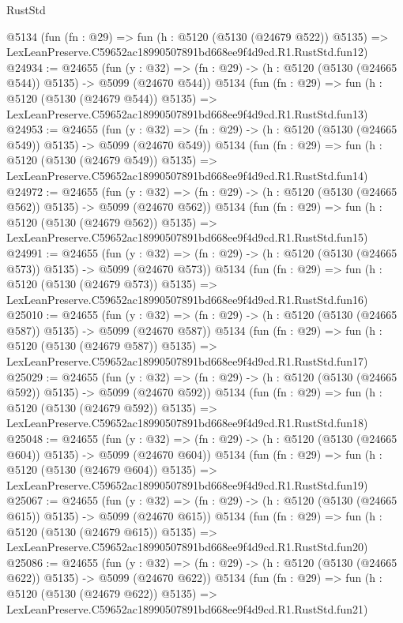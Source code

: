 \begin{lexlean}{RustStd}
\begin{coremodule}
    @5134
    (fun (fn : @29) =>
    fun (h : @5120 (@5130 (@24679 @522)) @5135) =>
    LexLeanPreserve.C59652ac18990507891bd668ee9f4d9cd.R1.RustStd.fun12)
@24934 := @24655
    (fun (y : @32) => (fn : @29) -> (h : @5120 (@5130 (@24665 @544)) @5135) -> @5099 (@24670 @544))
    @5134
    (fun (fn : @29) =>
    fun (h : @5120 (@5130 (@24679 @544)) @5135) =>
    LexLeanPreserve.C59652ac18990507891bd668ee9f4d9cd.R1.RustStd.fun13)
@24953 := @24655
    (fun (y : @32) => (fn : @29) -> (h : @5120 (@5130 (@24665 @549)) @5135) -> @5099 (@24670 @549))
    @5134
    (fun (fn : @29) =>
    fun (h : @5120 (@5130 (@24679 @549)) @5135) =>
    LexLeanPreserve.C59652ac18990507891bd668ee9f4d9cd.R1.RustStd.fun14)
@24972 := @24655
    (fun (y : @32) => (fn : @29) -> (h : @5120 (@5130 (@24665 @562)) @5135) -> @5099 (@24670 @562))
    @5134
    (fun (fn : @29) =>
    fun (h : @5120 (@5130 (@24679 @562)) @5135) =>
    LexLeanPreserve.C59652ac18990507891bd668ee9f4d9cd.R1.RustStd.fun15)
@24991 := @24655
    (fun (y : @32) => (fn : @29) -> (h : @5120 (@5130 (@24665 @573)) @5135) -> @5099 (@24670 @573))
    @5134
    (fun (fn : @29) =>
    fun (h : @5120 (@5130 (@24679 @573)) @5135) =>
    LexLeanPreserve.C59652ac18990507891bd668ee9f4d9cd.R1.RustStd.fun16)
@25010 := @24655
    (fun (y : @32) => (fn : @29) -> (h : @5120 (@5130 (@24665 @587)) @5135) -> @5099 (@24670 @587))
    @5134
    (fun (fn : @29) =>
    fun (h : @5120 (@5130 (@24679 @587)) @5135) =>
    LexLeanPreserve.C59652ac18990507891bd668ee9f4d9cd.R1.RustStd.fun17)
@25029 := @24655
    (fun (y : @32) => (fn : @29) -> (h : @5120 (@5130 (@24665 @592)) @5135) -> @5099 (@24670 @592))
    @5134
    (fun (fn : @29) =>
    fun (h : @5120 (@5130 (@24679 @592)) @5135) =>
    LexLeanPreserve.C59652ac18990507891bd668ee9f4d9cd.R1.RustStd.fun18)
@25048 := @24655
    (fun (y : @32) => (fn : @29) -> (h : @5120 (@5130 (@24665 @604)) @5135) -> @5099 (@24670 @604))
    @5134
    (fun (fn : @29) =>
    fun (h : @5120 (@5130 (@24679 @604)) @5135) =>
    LexLeanPreserve.C59652ac18990507891bd668ee9f4d9cd.R1.RustStd.fun19)
@25067 := @24655
    (fun (y : @32) => (fn : @29) -> (h : @5120 (@5130 (@24665 @615)) @5135) -> @5099 (@24670 @615))
    @5134
    (fun (fn : @29) =>
    fun (h : @5120 (@5130 (@24679 @615)) @5135) =>
    LexLeanPreserve.C59652ac18990507891bd668ee9f4d9cd.R1.RustStd.fun20)
@25086 := @24655
    (fun (y : @32) => (fn : @29) -> (h : @5120 (@5130 (@24665 @622)) @5135) -> @5099 (@24670 @622))
    @5134
    (fun (fn : @29) =>
    fun (h : @5120 (@5130 (@24679 @622)) @5135) =>
    LexLeanPreserve.C59652ac18990507891bd668ee9f4d9cd.R1.RustStd.fun21)

\end{coremodule}
\end{lexlean}
